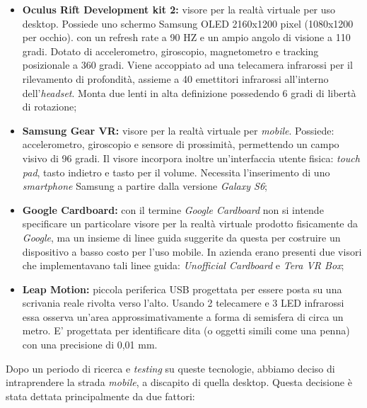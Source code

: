 \begin{itemize}
	\item \textbf{Oculus Rift Development kit 2:} visore per la realtà virtuale per uso desktop. Possiede uno schermo Samsung OLED 2160x1200 pixel (1080x1200 per occhio). con un refresh rate a 90 HZ e un ampio angolo di visione a 110 gradi. Dotato di accelerometro, giroscopio, magnetometro e tracking posizionale a 360 gradi. Viene accoppiato ad una telecamera infrarossi per il rilevamento di profondità, assieme a 40 emettitori infrarossi all'interno dell'\textit{headset}. Monta due lenti in alta definizione possedendo 6 gradi di libertà di rotazione;
	
	\item \textbf{Samsung Gear VR:} visore per la realtà virtuale per \textit{mobile}. Possiede: accelerometro, giroscopio e sensore di prossimità, permettendo un campo visivo di 96 gradi. Il visore incorpora inoltre un'interfaccia utente fisica: \textit{touch pad}, tasto indietro e tasto per il volume. Necessita l'inserimento di uno \textit{smartphone} Samsung a partire dalla versione \textit{Galaxy S6};
	
	\item \textbf{Google Cardboard:} con il termine \textit{Google Cardboard} non si intende specificare un particolare visore per la realtà virtuale prodotto fisicamente da \textit{Google}, ma un insieme di linee guida suggerite da questa per costruire un dispositivo a basso costo per l'uso mobile. In azienda erano presenti due visori che implementavano tali linee guida: \textit{Unofficial Cardboard} e \textit{Tera VR Box};
	
	\item \textbf{Leap Motion:} piccola periferica USB  progettata per essere posta su una scrivania reale rivolta verso l'alto. Usando 2 telecamere e 3 LED infrarossi essa osserva un'area approssimativamente a forma di semisfera di circa un metro. E' progettata per identificare dita (o oggetti simili come una penna) con una precisione di 0,01 mm. 
\end{itemize}

Dopo un periodo di ricerca e \textit{testing} su queste tecnologie, abbiamo deciso di intraprendere la strada \textit{mobile}, a discapito di quella desktop. Questa decisione è stata dettata principalmente da due fattori:

